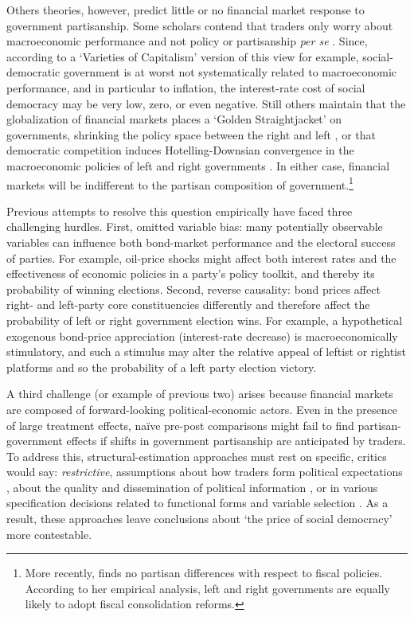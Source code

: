 \documentclass[12pt]{article}
\begin{document}
Others theories, however, predict little or no financial market response to government partisanship. Some scholars contend that traders only worry about macroeconomic performance and not policy or partisanship \textit{per se} \citep{Garrett1998, Mosley2000}. Since, according to a `Varieties of Capitalism' version of this view for example, social-democratic government is at worst not systematically related to macroeconomic performance, and in particular to inflation, the interest-rate cost of social democracy may be very low, zero, or even negative. Still others maintain that the globalization of financial markets places a `Golden Straightjacket' on governments, shrinking the policy space between the right and left \citep{Rodrik2000}, or that democratic competition induces  Hotelling-Downsian convergence in the macroeconomic policies of left and right governments \citep{Clark2003}. In either case, financial markets will be indifferent to the partisan composition of government.\footnote{More recently, \cite{hubscher2016politics} finds no partisan differences with respect to fiscal policies. According to her empirical analysis, left and right governments are equally likely to adopt fiscal consolidation reforms.}

Previous attempts to resolve this question empirically have faced three challenging hurdles. First, omitted variable bias: many potentially observable variables can influence both bond-market performance and the electoral success of parties. For example, oil-price shocks might affect both interest rates and the effectiveness of economic policies in a party's policy toolkit, and thereby its probability of winning elections. Second, reverse causality: bond prices affect right- and left-party core constituencies differently and therefore affect the probability of left or right government election wins. For example, a hypothetical exogenous bond-price appreciation (interest-rate decrease) is macroeconomically stimulatory, and such a stimulus may alter the relative appeal of leftist or rightist platforms and so the probability of a left party election victory. 

A third challenge (or example of previous two) arises because financial markets are composed of forward-looking political-economic actors. Even in the presence of large treatment effects, na\"ive pre-post comparisons might fail to find partisan-government effects if shifts in government partisanship are anticipated by traders. To address this, structural-estimation approaches must rest on specific, critics would say: \textit{restrictive}, assumptions about how traders form political expectations \citep{Alesina1997,pastor2013political}, about the quality and dissemination of political information \citep{Herron2000}, or in various specification decisions related to functional forms and variable selection \citep{Garrett1998, Franzese2002, Clark2003, Mosley2003, Bernhard2006}. As a result, these approaches leave conclusions about `the price of social democracy' more contestable. 
\end{document}
